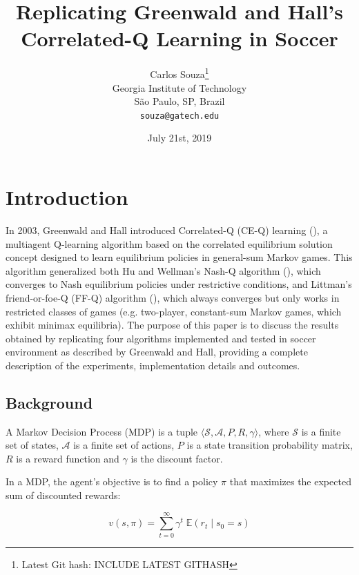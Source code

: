 \documentclass{article}
\title{Replicating Greenwald and Hall's Correlated-Q Learning in Soccer}
\date{July 21st, 2019}
\author{
Carlos Souza\thanks{Latest Git hash: INCLUDE LATEST GITHASH}\\
Georgia Institute of Technology\\
São Paulo, SP, Brazil \\
\texttt{souza@gatech.edu} \\
}
\begin{document}
    \maketitle



    \section{Introduction}
    \label{sec:introduction}
    In 2003, Greenwald  and Hall introduced Correlated-Q (CE-Q) learning (\cite{greenwald2003}), a multiagent Q-learning algorithm based on the correlated equilibrium solution concept designed to learn equilibrium policies in general-sum Markov games.
    This algorithm generalized both Hu and Wellman's Nash-Q algorithm (\cite{hu1998}), which converges to Nash equilibrium policies under restrictive conditions, and Littman's friend-or-foe-Q (FF-Q) algorithm (\cite{littman2001}), which always converges but only works in restricted classes of games (e.g. two-player, constant-sum Markov games, which exhibit minimax equilibria).
    The purpose of this paper is to discuss the results obtained by replicating four algorithms implemented and tested in soccer environment as described by Greenwald and Hall, providing a complete description of the experiments, implementation details and outcomes.

    \subsection{Background}
    \label{subsec:background}
    A Markov Decision Process (MDP) is a tuple $\langle \mathcal{S}, \mathcal{A}, P, R, \gamma \rangle$, where $\mathcal{S}$ is a finite set of states, $\mathcal{A}$ is a finite set of actions, $P$ is a state transition probability matrix, $R$ is a reward function and $\gamma$ is the discount factor.

    In a MDP, the agent's objective is to find a policy $\pi$ that maximizes the expected sum of discounted rewards:

    \begin{equation}
        v(s, \pi) = \sum_{t=0}^{\infty} \gamma^{t} \; \mathbb{E}(r_{t} \; | \; s_{0} = s)
    \end{equation}
\end{document}
